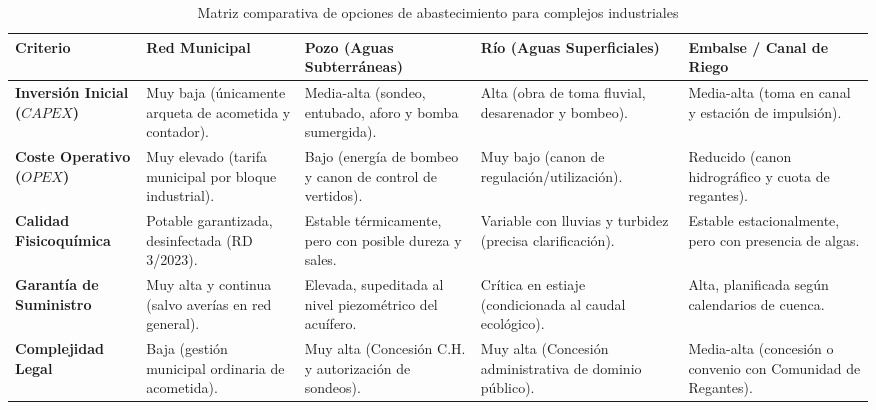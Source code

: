 \documentclass{report}
\begin{document}
\begin{table}[H]
    \centering
    \small
    \caption{Matriz comparativa de opciones de abastecimiento para complejos industriales}
    \label{tab:comparativa_fuentes}
    \begin{tabularx}{\textwidth}{@{}lXXXX@{}}
        \toprule
        \textbf{Criterio} & \textbf{Red Municipal} & \textbf{Pozo (Aguas Subterráneas)} & \textbf{Río (Aguas Superficiales)} & \textbf{Embalse / Canal de Riego} \\
        \midrule
        \textbf{Inversión Inicial ($CAPEX$)} & Muy baja (únicamente arqueta de acometida y contador). & Media-alta (sondeo, entubado, aforo y bomba sumergida). & Alta (obra de toma fluvial, desarenador y bombeo). & Media-alta (toma en canal y estación de impulsión). \\
        \addlinespace
        \textbf{Coste Operativo ($OPEX$)} & Muy elevado (tarifa municipal por bloque industrial). & Bajo (energía de bombeo y canon de control de vertidos). & Muy bajo (canon de regulación/utilización). & Reducido (canon hidrográfico y cuota de regantes). \\
        \addlinespace
        \textbf{Calidad Fisicoquímica} & Potable garantizada, desinfectada (RD 3/2023). & Estable térmicamente, pero con posible dureza y sales. & Variable con lluvias y turbidez (precisa clarificación). & Estable estacionalmente, pero con presencia de algas. \\
        \addlinespace
        \textbf{Garantía de Suministro} & Muy alta y continua (salvo averías en red general). & Elevada, supeditada al nivel piezométrico del acuífero. & Crítica en estiaje (condicionada al caudal ecológico). & Alta, planificada según calendarios de cuenca. \\
        \addlinespace
        \textbf{Complejidad Legal} & Baja (gestión municipal ordinaria de acometida). & Muy alta (Concesión C.H. y autorización de sondeos). & Muy alta (Concesión administrativa de dominio público). & Media-alta (concesión o convenio con Comunidad de Regantes). \\
        \bottomrule
    \end{tabularx}
\end{table}
\end{document}
